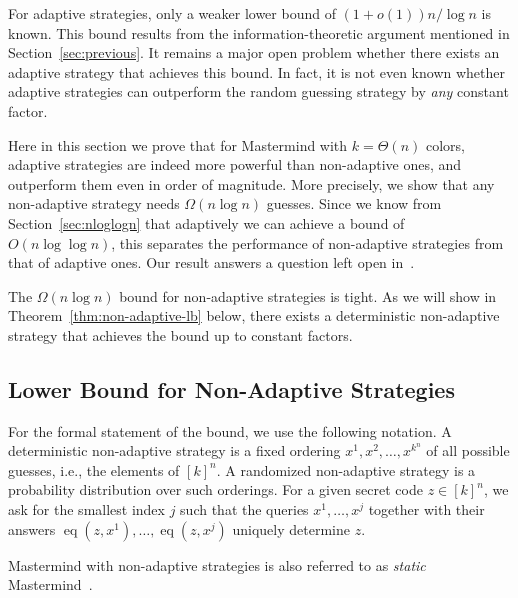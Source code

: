 \documentclass[english,a4paper,11pt]{article}
\newcommand{\comment}[1]{{\bf [#1]}}
\newcommand{\CW}[1]{\comment{\textcolor{blue}{CW: #1}}}
\DeclareMathOperator{\eq}{eq}
\begin{document}
{For adaptive strategies, only a weaker lower bound of $(1+o(1))n /\log n$ is known. This bound results from the information-theoretic argument mentioned in Section~\ref{sec:previous}. 
It remains a major open problem whether there exists an adaptive strategy that achieves this bound. In fact, it is not even known whether adaptive strategies can outperform the random guessing strategy by \emph{any} constant factor. 

Here in this section we prove that for Mastermind with $k=\Theta(n)$ colors, adaptive strategies are indeed more powerful than non-adaptive ones, and outperform them even in order of magnitude. 
More precisely, we show that any non-adaptive strategy needs $\Omega(n \log n)$ guesses. Since we know from Section~\ref{sec:nloglogn} that adaptively we can achieve a bound of $O(n \log \log n)$, this separates the performance of non-adaptive strategies from that of adaptive ones. Our result answers a question left open in~\cite{Goddard03}.

The $\Omega(n\log n)$ bound for non-adaptive strategies is tight. As we will show in Theorem~\ref{thm:non-adaptive-lb} below, there exists a deterministic non-adaptive strategy that achieves the bound up to constant factors.

\subsection{Lower Bound for Non-Adaptive Strategies}

For the formal statement of the bound, we use the following notation.
A deterministic non-adaptive strategy is a fixed ordering $x^1, x^2, \ldots, x^{k^n}$ of all possible guesses, i.e., the elements of $[k]^n$. A randomized non-adaptive strategy is a probability distribution over such orderings. For a given secret code $z\in[k]^n$, we ask for the smallest index $j$ such that the queries $x^1, \ldots, x^j$ together with their answers $\eq(z,x^1), \ldots, \eq(z,x^j)$ uniquely determine $z$. 

Mastermind with non-adaptive strategies is also referred to as \emph{static} Mastermind~\cite{Goddard03}. 

}
\end{document}

